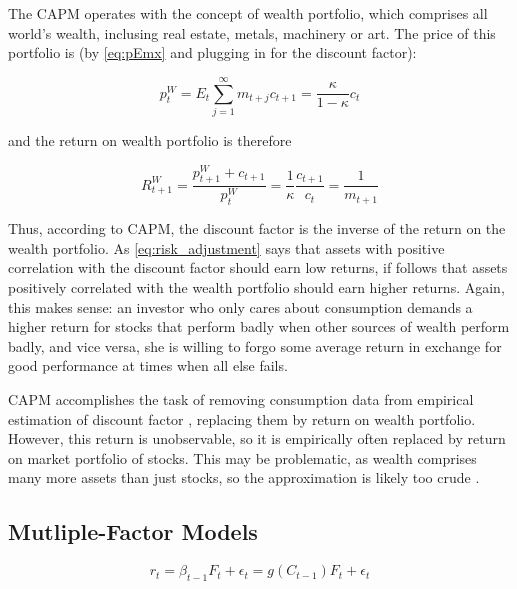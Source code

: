 	 		The CAPM operates with the concept of wealth portfolio, which comprises all world's wealth, inclusing real estate, metals, machinery or art. The price of this portfolio is (by \ref{eq:pEmx} and plugging in for the discount factor):  
	 		
	 		\begin{equation}
	 		p_t^W  = E_t \sum_{j=1}^{\infty} m_{t+j}c_{t+1} = \frac{\kappa}{1-\kappa}c_t
	 		\end{equation}
	 		
	 		and the return on wealth portfolio is therefore 
	 		
	 		\begin{equation}
	 		R_{t+1}^W  = \frac{p_{t+1}^W + c_{t+1}}{p_t^W} = \frac{1}{\kappa} \frac{c_{t+1}}{c_t} = \frac{1}{m_{t+1}}
	 		\end{equation}
	 		
	 		Thus, according to CAPM, the discount factor is the inverse of the return on the wealth portfolio. As \ref{eq:risk_adjustment} says that assets with positive correlation with the discount factor should earn low returns, if follows that assets positively correlated with the wealth portfolio should earn higher returns. Again, this makes sense: an investor who only cares about consumption demands a higher return for stocks that perform badly when other sources of wealth perform badly, and vice versa, she is willing to forgo some average return in exchange for good performance at times when all else fails.   
	 		
	 		CAPM accomplishes the task of removing consumption data from empirical estimation of discount factor \citep{cochrane2009asset}, replacing them by return on wealth portfolio. However, this return is unobservable, so it is empirically often replaced by return on market portfolio of stocks. This may be problematic, as wealth comprises many more assets than just stocks, so the approximation is likely too crude \citep{roll1977critique}.  
	 		
	 		
	 	\subsection{Mutliple-Factor Models}
	 		
	 		
	 	
	 	
	 	\begin{equation}
	 		r_t = \beta_{t-1}F_t + \epsilon_t  = g(C_{t-1})F_t + \epsilon_t \label{eq:asset_pricing}
	 	\end{equation}
	 	
